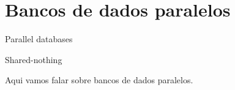 \section{Bancos de dados paralelos}

Parallel databases \cite{Dewitt1992}

Shared-nothing \cite{Stonebraker1986}

Aqui vamos falar sobre bancos de dados paralelos.

